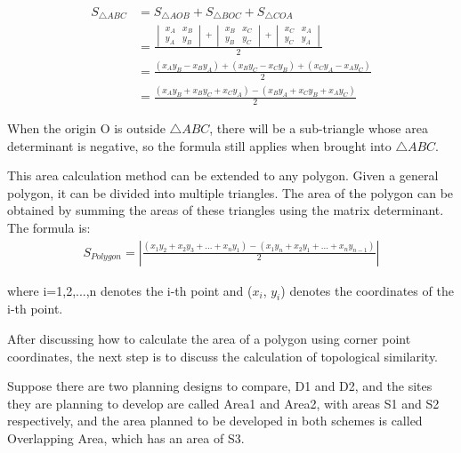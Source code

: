 \begin{equation}
\begin{split}
S_{\triangle ABC}
&=S_{\triangle AOB}+S_{\triangle BOC}+S_{\triangle COA}\\
&=\frac{\begin{vmatrix}
  x_{A} &x_{B}  \\
  y_{A} &y_{B} 
\end{vmatrix}+\begin{vmatrix}
  x_{B}& x_{C}\\
  y_{B}&y_{C}
\end{vmatrix}+\begin{vmatrix}
  x_{C}&x_{A} \\
  y_{C}&y_{A}
\end{vmatrix}}{2}\\
&=\frac{(x_{A}y_{B}-x_{B}y_{A})+(x_{B}y_{C}-x_{C}y_{B}) +(x_{C}y_{A}-x_{A}y_{C})  }{2}\\
&=\frac{(x_{A}y_{B}+x_{B}y_{C}+x_{C}y_{A})-(x_{B}y_{A}+x_{C}y_{B}+x_{A}y_{C})}{2}
\end{split}
\end{equation}

When the origin O is outside $\triangle ABC$, there will be a sub-triangle whose area determinant is negative, so the formula still applies when brought into $\triangle ABC$.

This area calculation method can be extended to any polygon. Given a general polygon, it can be divided into multiple triangles. The area of the polygon can be obtained by summing the areas of these triangles using the matrix determinant.
The formula is:
\begin{equation}
\begin{split}
S_{Polygon}= \left | \frac{(x_{1}y_{2} +x_{2}y_{3}+...+x_{n}y_{1} )-(x_{1}y_{n} +x_{2}y_{1}+...+x_{n}y_{n-1})}{2}  \right | 
\end{split}
\end{equation}

where i=1,2,...,n denotes the i-th point and ($x_{i}$, $y_{i}$) denotes the coordinates of the i-th point.

After discussing how to calculate the area of a polygon using corner point coordinates, the next step is to discuss the calculation of topological similarity.

Suppose there are two planning designs to compare, D1 and D2, and the sites they are planning to develop are called Area1 and Area2, with areas S1 and S2 respectively, and the area planned to be developed in both schemes is called Overlapping Area, which has an area of S3.

